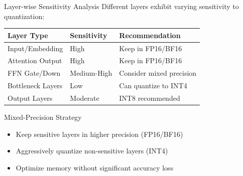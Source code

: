 \documentclass[aspectratio=169,10pt]{beamer}
\begin{document}
\begin{frame}{Layer-wise Sensitivity Analysis}
    Different layers exhibit varying sensitivity to quantization:

    \vspace{0.3cm}
    \begin{table}
        \centering
        \small
        \begin{tabular}{lll}
            \toprule
            \textbf{Layer Type} & \textbf{Sensitivity} & \textbf{Recommendation} \\
            \midrule
            Input/Embedding & High & Keep in FP16/BF16 \\
            Attention Output & High & Keep in FP16/BF16 \\
            FFN Gate/Down & Medium-High & Consider mixed precision \\
            Bottleneck Layers & Low & Can quantize to INT4 \\
            Output Layers & Moderate & INT8 recommended \\
            \bottomrule
        \end{tabular}
    \end{table}

    \vspace{0.5cm}
    \begin{block}{Mixed-Precision Strategy}
        \begin{itemize}
            \item Keep sensitive layers in higher precision (FP16/BF16)
            \item Aggressively quantize non-sensitive layers (INT4)
            \item Optimize memory without significant accuracy loss
        \end{itemize}
    \end{block}
\end{frame}
\end{document}
